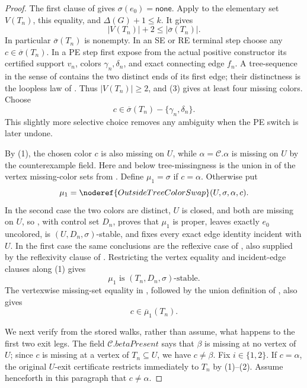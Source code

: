 \begin{proof}
The first clause of  gives
\(\sigma(e_0)=\mathsf{none}\).
Apply  to the elementary set
\(V(T_n)\), this equality, and \(\Delta(G)+1\leq k\).  It gives
\[
             |V(T_n)|+2\leq |\overline\sigma(T_n)|.          \tag{3}
\]
In particular \(\overline\sigma(T_n)\) is nonempty.  In an SE or RE
terminal step choose any
\(c\in\overline\sigma(T_n)\).  In a PE step first expose from the actual
positive constructor its certified support \(v_n\), colors
\(\gamma_n,\delta_n\), and exact connecting edge \(f_n\).  A
tree-sequence in the sense of  contains the two
distinct ends of its first edge; their distinctness is the loopless law
of .  Thus \(|V(T_n)|\geq2\), and (3) gives
at least four missing colors.  Choose
\[
 c\in\overline\sigma(T_n)-\{\gamma_n,\delta_n\}.             \tag{4}
\]
This slightly more selective choice removes any ambiguity when the PE
switch is later undone.

By (1), the chosen color \(c\) is also missing on \(U\), while
\(\alpha=\mathcal C.\alpha\) is missing on \(U\) by the counterexample
field.  Here and below tree-missingness is the union in
 of the vertex missing-color sets from
.  Define \(\mu_1=\sigma\) if \(c=\alpha\).
Otherwise put
\[
 \mu_1=\noderef{OutsideTreeColorSwap}(U,\sigma,\alpha,c).
\]
In the second case the two colors are distinct, \(U\) is closed, and
both are missing on \(U\), so
, with control set \(D_n\), proves
that \(\mu_1\) is proper, leaves exactly \(e_0\) uncolored, is
\((U,D_n,\sigma)\)-stable, and fixes every exact edge identity incident
with \(U\).  In the first case the same conclusions are the reflexive
case of , also supplied by the reflexivity clause
of .  Restricting the vertex equality and incident-edge
clauses along (1) gives
\[
            \mu_1\text{ is }(T_n,D_n,\sigma)\text{-stable}.  \tag{5}
\]
The vertexwise missing-set equality in , followed
by the union definition of , also gives
\[
                         c\in\overline{\mu}_1(T_n).            \tag{5a}
\]

We next verify from the stored walks, rather than assume, what happens to
the first two exit legs.  The field
\(\mathcal C.\mathit{betaPresent}\) says that \(\beta\) is missing at no
vertex of \(U\); since \(c\) is missing at a vertex of \(T_n\subseteq U\),
we have \(c\ne\beta\).  Fix \(i\in\{1,2\}\).  If \(c=\alpha\), the
original \(U\)-exit certificate restricts immediately to \(T_n\) by
(1)--(2).  Assume henceforth in this paragraph that \(c\ne\alpha\).


\end{proof}
